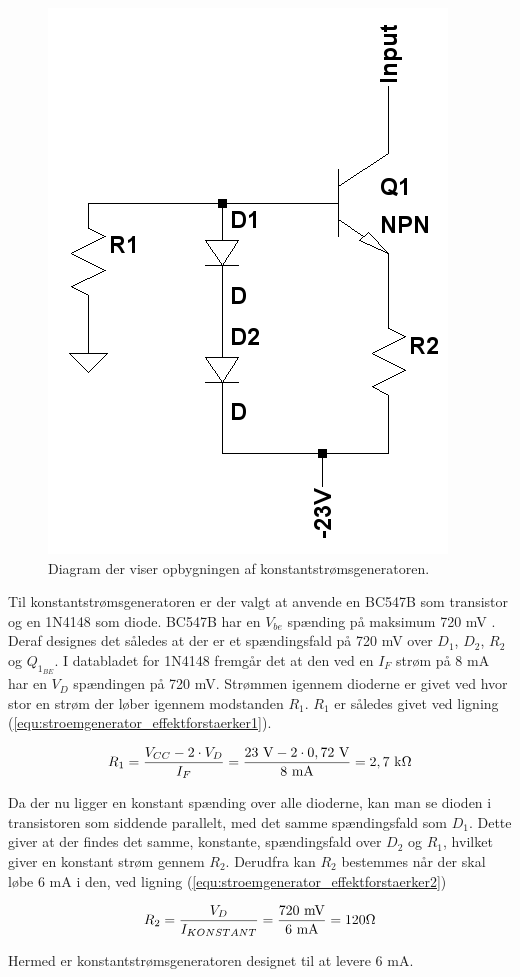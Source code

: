 \begin{figure}[h]
\centering
\includegraphics[scale=0.35]{teknisk/effektforstaerker/stoemgenerator.png}
\caption{Diagram der viser opbygningen af konstantstrømsgeneratoren.}
\label{konstantstroemsgenerator_model}
\end{figure}

Til konstantstrømsgeneratoren er der valgt at anvende en BC547B som transistor og en 1N4148 som diode. BC547B har en $V_{be}$ spænding på maksimum 720 mV . Deraf designes det således at der er et spændingsfald på 720 mV over $D_1$, $D_2$, $R_{2}$ og $Q_{1_{BE}}$. I databladet for 1N4148 fremgår det at den  ved en $I_F$ strøm på 8 mA har en $V_D$ spændingen på 720 mV. Strømmen igennem dioderne er givet ved hvor stor en strøm der løber igennem modstanden $R_{1}$. $R_{1}$ er således givet ved ligning (\ref{equ:stroemgenerator_effektforstaerker1}).

\begin{equation}
\label{equ:stroemgenerator_effektforstaerker1}
R_{1} = \frac{V_{CC} - 2 \cdot V_D}{I_F} = \mathrm{\frac{23~V - 2 \cdot 0,72~V}{8~mA} = 2,7~k\ohm}
\end{equation}

Da der nu ligger en konstant spænding over alle dioderne, kan man se dioden i transistoren som siddende parallelt, med det samme spændingsfald som $D_1$. Dette giver at der findes det samme, konstante, spændingsfald over $D_2$ og $R_{1}$, hvilket giver en konstant strøm gennem $R_{2}$. Derudfra kan $R_{2}$ bestemmes når der skal løbe 6 mA i den, ved ligning (\ref{equ:stroemgenerator_effektforstaerker2})

\begin{equation}
\label{equ:stroemgenerator_effektforstaerker2}
R_{2} = \frac{V_{D}}{I_{KONSTANT}} = \mathrm{\frac{720~mV}{6~mA} = 120\ohm}
\end{equation}

Hermed er konstantstrømsgeneratoren designet til at levere 6 mA.
